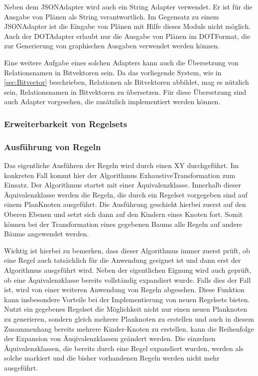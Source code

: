 Neben dem JSON\-Adapter wird auch ein String Adapter verwendet. Er ist für die Ausgabe von Plänen als String verantwortlich. Im Gegensatz zu einem JSON\-Adapter ist die Eingabe von Plänen mit Hilfe dieses Moduls nicht möglich. Auch der DOT\-Adapter erlaubt nur die Ausgabe von Plänen im DOT\-Format, die  zur Generierung von graphischen Ausgaben verwendet werden können.

Eine weitere Aufgabe eines solchen Adapters kann auch die Übersetzung von Relationsnamen in Bitvektoren sein. Da das vorliegende System, wie in \ref{sec:Bitvector} beschrieben, Relationen als Bitvektoren abbildet, mag es nützlich sein, Relationsnamen in Bitvektoren zu übersetzen. Für diese Übersetzung sind auch Adapter vorgesehen, die zusätzlich implementiert werden können.












\subsubsection{Erweiterbarkeit von Regelsets}





\subsubsection{Ausführung von Regeln}

Das eigentliche Ausführen der Regeln wird durch einen XY durchgeführt. Im konkreten Fall kommt hier der Algorithmus ExhaustiveTransformation zum Einsatz. Der Algorithmus startet mit einer Äquivalenzklasse. Innerhalb dieser Äquivalenzklasse werden die Regeln, die durch ein Regelset vorgegeben sind auf einem PlanKnoten ausgeführt. Die Ausführung geschieht hierbei zuerst auf den Oberen Ebenen und setzt sich dann auf den Kindern eines Knoten fort. Somit können bei der Transformation eines gegebenen Baums alle Regeln auf andere Bäume angewendet werden.

Wichtig ist hierbei zu bemerken, dass dieser Algorithmus immer zuerst prüft, ob eine Regel auch tatsächlich für die Anwendung geeignet ist und dann erst der Algorithmus ausgeführt wird. Neben der eigentlichen Eignung wird auch geprüft, ob eine Äquivalenzklasse bereits vollständig expandiert wurde. Falls dies der Fall ist, wird von einer weiteren Anwendung von Regeln abgesehen. Diese Funktion kann insbesondere Vorteile bei der Implementierung von neuen Regelsets bieten. Nutzt ein gegebenes Regelset die Möglichkeit nicht nur einen neuen Planknoten zu generieren, sondern gleich mehrere Planknoten zu erstellen und auch in diesem Zusammenhang bereits mehrere Kinder-Knoten zu erstellen, kann die Reihenfolge der Expansion von Äuqivalenzklassen geändert werden. Die einzelnen Äquivalenzklassen, die bereits durch eine Regel expandiert wurden, werden als solche markiert und die bisher vorhandenen Regeln werden nicht mehr ausgeführt.




